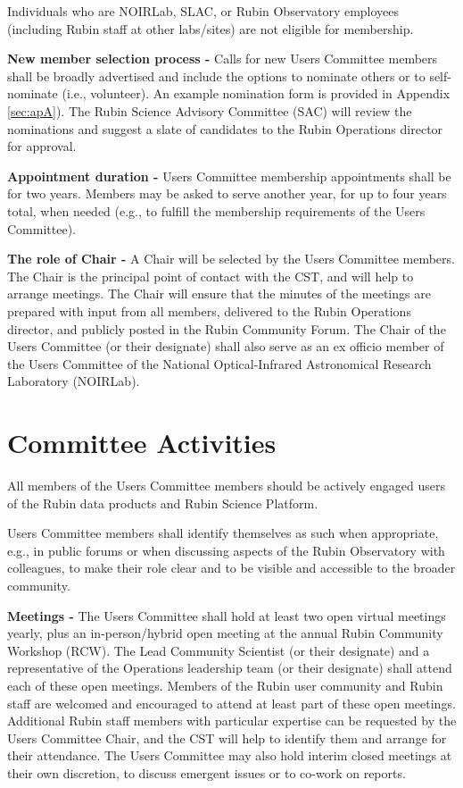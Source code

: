 \documentclass[OPS,toc]{lsstdoc}
\begin{document}
Individuals who are NOIRLab, SLAC, or Rubin Observatory employees (including Rubin staff at other labs/sites) are not eligible for membership. 

\textbf{New member selection process - } Calls for new Users Committee members shall be broadly advertised and include the options to nominate others or to self-nominate (i.e., volunteer).
An example nomination form is provided in Appendix \ref{sec:apA}).
The Rubin Science Advisory Committee (SAC) will review the nominations and suggest a slate of candidates to the Rubin Operations director for approval.

\textbf{Appointment duration - } Users Committee membership appointments shall be for two years. 
Members may be asked to serve another year, for up to four years total, when needed (e.g., to fulfill the membership requirements of the Users Committee).

\textbf{The role of Chair - } A Chair will be selected by the Users Committee members.
The Chair is the principal point of contact with the CST, and will help to arrange meetings.
The Chair will ensure that the minutes of the meetings are prepared with input from all members, delivered to the Rubin Operations director, and publicly posted in the Rubin Community Forum.
The Chair of the Users Committee (or their designate) shall also serve as an ex officio member of the Users Committee of the National Optical-Infrared Astronomical Research Laboratory (NOIRLab). 


\section{Committee Activities}

All members of the Users Committee members should be actively engaged users of the Rubin data products and Rubin Science Platform.

Users Committee members shall identify themselves as such when appropriate, e.g., in public forums or when discussing aspects of the Rubin Observatory with colleagues, to make their role clear and to be visible and accessible to the broader community.

\textbf{Meetings -}
The Users Committee shall hold at least two open virtual meetings yearly, plus an in-person/hybrid open meeting at the annual Rubin Community Workshop (RCW).
The Lead Community Scientist (or their designate) and a representative of the Operations leadership team (or their designate) shall attend each of these open meetings.
Members of the Rubin user community and Rubin staff are welcomed and encouraged to attend at least part of these open meetings.
Additional Rubin staff members with particular expertise can be requested by the Users Committee Chair, 
and the CST will help to identify them and arrange for their attendance.
The Users Committee may also hold interim closed meetings at their own discretion, to discuss emergent issues or to co-work on reports.
\end{document}
